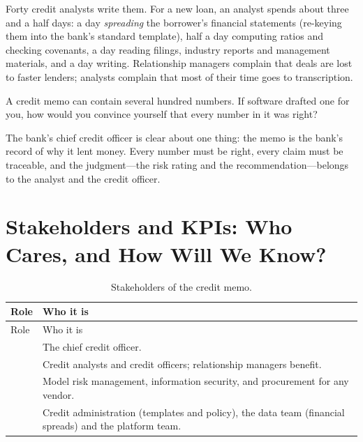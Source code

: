 Forty credit analysts write them. For a new loan, an analyst spends about three and a half days: a day \emph{spreading} the borrower's financial statements (re-keying them into the bank's standard template), half a day computing ratios and checking covenants, a day reading filings, industry reports and management materials, and a day writing. Relationship managers complain that deals are lost to faster lenders; analysts complain that most of their time goes to transcription.

\begin{thinkabout}
A credit memo can contain several hundred numbers. If software drafted one for you, how would you convince yourself that every number in it was right?
\end{thinkabout}

The bank's chief credit officer is clear about one thing: the memo is the bank's record of why it lent money. Every number must be right, every claim must be traceable, and the judgment---the risk rating and the recommendation---belongs to the analyst and the credit officer.

\section{Stakeholders and KPIs: Who Cares, and How Will We Know?}
\label{sec:loan-kpis}

\begingroup
\small
\begin{xltabular}{\textwidth}{@{}>{\raggedright\arraybackslash}p{2.0cm}>{\raggedright\arraybackslash}X@{}}
\caption{Stakeholders of the credit memo.}\label{tab:loan-stakeholders}\\
\toprule
{} Role & Who it is \\
\midrule
\endfirsthead
\toprule
{} Role & Who it is \\
\midrule
\endhead
{} & The chief credit officer. \\
 & Credit analysts and credit officers; relationship managers benefit. \\
 & Model risk management, information security, and procurement for any vendor. \\
 & Credit administration (templates and policy), the data team (financial spreads) and the platform team. \\
\bottomrule
\end{xltabular}
\endgroup

